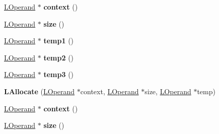 \begin{DoxyCompactItemize}
\item 
\hyperlink{classv8_1_1internal_1_1_l_operand}{L\+Operand} $\ast$ {\bfseries context} ()\hypertarget{classv8_1_1internal_1_1_l_allocate_a8e8d6f1d4913d84b1ecf49b67200b7a5}{}\label{classv8_1_1internal_1_1_l_allocate_a8e8d6f1d4913d84b1ecf49b67200b7a5}

\item 
\hyperlink{classv8_1_1internal_1_1_l_operand}{L\+Operand} $\ast$ {\bfseries size} ()\hypertarget{classv8_1_1internal_1_1_l_allocate_a39b42c01160d1f69ebea869bc4b92efe}{}\label{classv8_1_1internal_1_1_l_allocate_a39b42c01160d1f69ebea869bc4b92efe}

\item 
\hyperlink{classv8_1_1internal_1_1_l_operand}{L\+Operand} $\ast$ {\bfseries temp1} ()\hypertarget{classv8_1_1internal_1_1_l_allocate_a61237f94d30caf1437601ac509815068}{}\label{classv8_1_1internal_1_1_l_allocate_a61237f94d30caf1437601ac509815068}

\item 
\hyperlink{classv8_1_1internal_1_1_l_operand}{L\+Operand} $\ast$ {\bfseries temp2} ()\hypertarget{classv8_1_1internal_1_1_l_allocate_ac6d5be0b7ea0bdf9554a0a6921c3a70d}{}\label{classv8_1_1internal_1_1_l_allocate_ac6d5be0b7ea0bdf9554a0a6921c3a70d}

\item 
\hyperlink{classv8_1_1internal_1_1_l_operand}{L\+Operand} $\ast$ {\bfseries temp3} ()\hypertarget{classv8_1_1internal_1_1_l_allocate_a916d6443f8cbdce0c4ce9e54452f7fa3}{}\label{classv8_1_1internal_1_1_l_allocate_a916d6443f8cbdce0c4ce9e54452f7fa3}

\item 
{\bfseries L\+Allocate} (\hyperlink{classv8_1_1internal_1_1_l_operand}{L\+Operand} $\ast$context, \hyperlink{classv8_1_1internal_1_1_l_operand}{L\+Operand} $\ast$size, \hyperlink{classv8_1_1internal_1_1_l_operand}{L\+Operand} $\ast$temp)\hypertarget{classv8_1_1internal_1_1_l_allocate_a209c4f2b3724dbd7d16031c72c35931b}{}\label{classv8_1_1internal_1_1_l_allocate_a209c4f2b3724dbd7d16031c72c35931b}

\item 
\hyperlink{classv8_1_1internal_1_1_l_operand}{L\+Operand} $\ast$ {\bfseries context} ()\hypertarget{classv8_1_1internal_1_1_l_allocate_a8e8d6f1d4913d84b1ecf49b67200b7a5}{}\label{classv8_1_1internal_1_1_l_allocate_a8e8d6f1d4913d84b1ecf49b67200b7a5}

\item 
\hyperlink{classv8_1_1internal_1_1_l_operand}{L\+Operand} $\ast$ {\bfseries size} ()\hypertarget{classv8_1_1internal_1_1_l_allocate_a39b42c01160d1f69ebea869bc4b92efe}{}\label{classv8_1_1internal_1_1_l_allocate_a39b42c01160d1f69ebea869bc4b92efe}


\end{DoxyCompactItemize}
